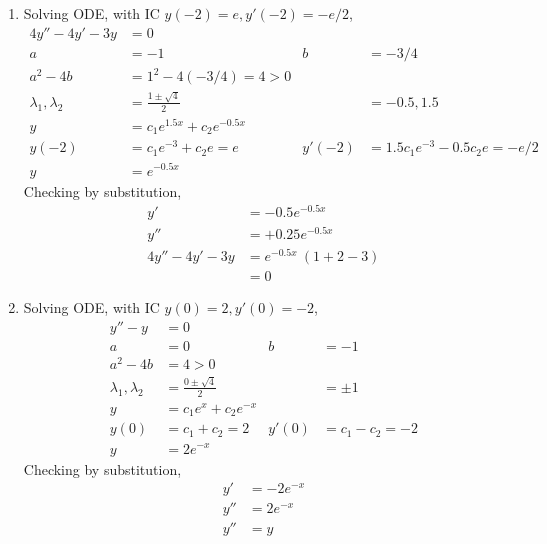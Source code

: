 \begin{enumerate}
    \item Solving ODE, with IC $ y(-2) = e, y'(-2) = -e/2 $,
          \begin{align}
              4y'' -4y' - 3y           & = 0                                                                             \\
              a                        & = -1                             & b      & = -3/4                              \\
              a^{2} - 4b               & = 1^{2} - 4(-3/4) = 4 > 0                                                       \\
              \lambda_{1}, \lambda_{2} & = \frac{1 \pm \sqrt{4}}{2}       &        & = -0.5, 1.5                         \\
              y                        & = c_{1}e^{1.5x} + c_{2}e^{-0.5x}                                                \\
              y(-2)                    & = c_{1}e^{-3} + c_{2}e = e       & y'(-2) & = 1.5c_{1}e^{-3} - 0.5c_{2}e = -e/2 \\
              y                        & = e^{-0.5x}
          \end{align}
          Checking by substitution,
          \begin{align}
              y'              & = -0.5e^{-0.5x}          \\
              y''             & = + 0.25e^{-0.5x}        \\
              4y'' - 4y' - 3y & = e^{-0.5x}\ (1 + 2 - 3) \\
                              & = 0
          \end{align}

    \item Solving ODE, with IC $ y(0) = 2 , y'(0) = -2$,
          \begin{align}
              y'' - y                  & = 0                                                       \\
              a                        & = 0                        & b     & = -1                 \\
              a^{2} - 4b               & = 4 > 0                                                   \\
              \lambda_{1}, \lambda_{2} & = \frac{0 \pm \sqrt{4}}{2} &       & = \pm 1              \\
              y                        & = c_{1}e^{x} + c_{2}e^{-x}                                \\
              y(0)                     & = c_{1} + c_{2} = 2        & y'(0) & = c_{1} - c_{2} = -2 \\
              y                        & = 2e^{-x}
          \end{align}
          Checking by substitution,
          \begin{align}
              y'  & = -2e^{-x} \\
              y'' & = 2e^{-x}  \\
              y'' & = y
          \end{align}


\end{enumerate}
